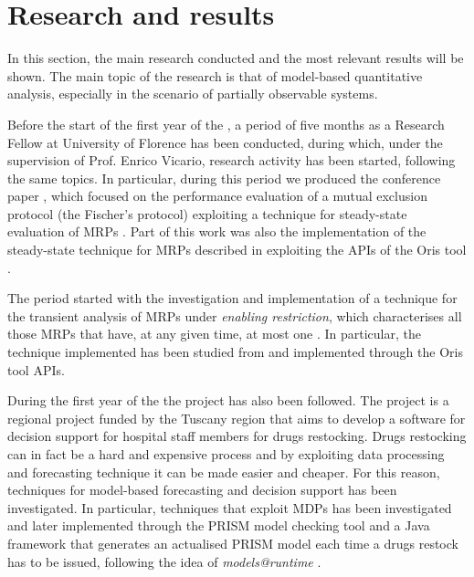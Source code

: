 
\section*{Research and results}
  
  In this section, the main research conducted and the most relevant results will be shown. The main topic of the  research is that of model-based quantitative analysis, especially in the scenario of partially observable systems.
  
  Before the start of the first year of the , a period of five months as a Research Fellow at University of Florence has been conducted, during which, under the supervision of Prof. Enrico Vicario, research activity has been started, following the same topics. In particular, during this period we produced the conference paper \cite{martina2016performance}, which focused on the performance evaluation of a mutual exclusion protocol (the Fischer's protocol) exploiting a technique for steady-state evaluation of \acp{MRP} \cite{logothetis1995markov}. Part of this work was also the implementation of the steady-state technique for \acp{MRP} described in \cite{logothetis1995markov} exploiting the \acp{API} of the Oris tool \cite{bucci2010oris}.
  
  The  period started with the investigation and implementation of a technique for the transient analysis of \acp{MRP} under \textit{enabling restriction}, which characterises all those \acp{MRP} that have, at any given time, at most one . In particular, the technique implemented has been studied from \cite{german1995transient} and implemented through the Oris tool \acp{API}.
  
  During the first year of the  the  project has also been followed. The  project is a regional project funded by the Tuscany region that aims to develop a software for decision support for hospital staff members for drugs restocking. Drugs restocking can in fact be a hard and expensive process and by exploiting data processing and forecasting technique it can be made easier and cheaper. For this reason, techniques for model-based forecasting and decision support has been investigated. In particular, techniques that exploit \acp{MDP} \cite{bellman1957markovian} has been investigated and later implemented through the PRISM model checking tool \cite{KNP11} and a Java framework that generates an actualised PRISM model each time a drugs restock has to be issued, following the idea of \textit{models@runtime} \cite{blair2009models}.
  

